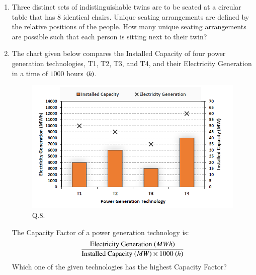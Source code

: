 \documentclass[journal,12pt,onecolumn]{IEEEtran}
\theoremstyle{remark}
\begin{document}
\begin{enumerate}
\item Three distinct sets of indistinguishable twins are to be seated at a circular table that has $8$ identical chairs. Unique seating arrangements are defined by the relative positions of the people. How many unique seating arrangements are possible such that each person is sitting next to their twin?
\begin{enumerate}
\end{enumerate}
\hfill{}

\item The chart given below compares the Installed Capacity  of four power generation technologies, T1, T2, T3, and T4, and their Electricity Generation  in a time of $1000$ hours $\left(h\right)$.
\begin{figure}[H]
    \centering
    \includegraphics[width=0.8\columnwidth]{Figs/fig_1.png}
    \caption{Q.8.}
    \label{fig:q8}
\end{figure}
The Capacity Factor of a power generation technology is:
$$ \frac{\text{Electricity Generation \ensuremath{\left(MWh\right)}}}{\text{Installed Capacity \ensuremath{\left(MW\right)}} \times 1000 \text{ \ensuremath{\left(h\right)}}} $$
Which one of the given technologies has the highest Capacity Factor?
\begin{enumerate}
\end{enumerate}
\hfill{}


\end{enumerate}
\end{document}

